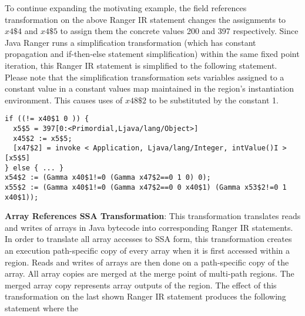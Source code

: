 %
To continue expanding the motivating example, the field references transformation on the above Ranger IR statement
changes the assignments to $x4\$4$ and $x4\$5$ to assign them the concrete values 200 and 397 respectively.
%
Since Java Ranger runs a simplification transformation (which has constant propagation and if-then-else statement
simplification) within the same fixed point iteration, this Ranger IR statement is simplified to the following statement.
%
Please note that the simplification transformation sets variables assigned to a constant value in a constant values
map maintained in the region\rq s instantiation environment.
%
This causes uses of $x48\$2$ to be substituted by the constant 1.
%
\begin{lstlisting}[numbers=none]
if ((!= x40$1 0 )) {
  x5$5 = 397[0:<Primordial,Ljava/lang/Object>]
  x45$2 := x5$5;
  [x47$2] = invoke < Application, Ljava/lang/Integer, intValue()I >[x5$5]
} else { ... }
x54$2 := (Gamma x40$1!=0 (Gamma x47$2==0 1 0) 0);
x55$2 := (Gamma x40$1!=0 (Gamma x47$2==0 0 x40$1) (Gamma x53$2!=0 1 x40$1));
\end{lstlisting}
\textbf{Array References SSA Transformation}: This transformation translates reads and writes of arrays in
Java bytecode into corresponding Ranger IR statements.
%
In order to translate all array accesses to SSA form, this transformation creates an execution path-specific copy of
every array when it is first accessed within a region.
%
Reads and writes of arrays are then done on a path-specific copy of the array.
%
All array copies are merged at the merge point of multi-path regions.
%
The merged array copy represents array outputs of the region.
%
The effect of this transformation on the last shown Ranger IR statement produces the following statement where the

